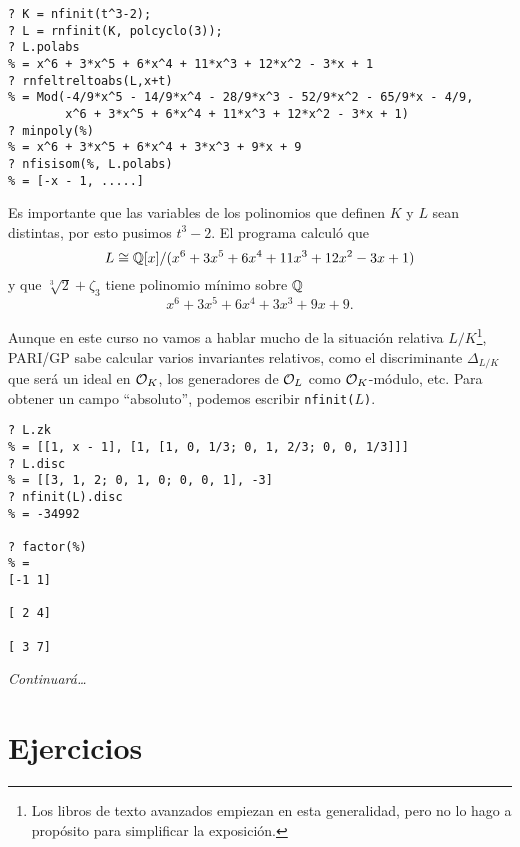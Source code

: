 \begin{shaded}
\begin{verbatim}
? K = nfinit(t^3-2);
? L = rnfinit(K, polcyclo(3));
? L.polabs
% = x^6 + 3*x^5 + 6*x^4 + 11*x^3 + 12*x^2 - 3*x + 1
? rnfeltreltoabs(L,x+t)
% = Mod(-4/9*x^5 - 14/9*x^4 - 28/9*x^3 - 52/9*x^2 - 65/9*x - 4/9,
        x^6 + 3*x^5 + 6*x^4 + 11*x^3 + 12*x^2 - 3*x + 1)
? minpoly(%)
% = x^6 + 3*x^5 + 6*x^4 + 3*x^3 + 9*x + 9
? nfisisom(%, L.polabs)
% = [-x - 1, .....]
\end{verbatim}
\end{shaded}

Es importante que las variables de los polinomios que definen $K$ y $L$ sean
distintas, por esto pusimos $t^3 - 2$. El programa calculó que
$$L \cong \mathbb{Q}[x]/(x^6 + 3 x^5 + 6 x^4 + 11 x^3 + 12 x^2 - 3 x + 1)$$
y que $\sqrt[3]{2} + \zeta_3$ tiene polinomio mínimo sobre $\mathbb{Q}$
$$x^6 + 3 x^5 + 6 x^4 + 3 x^3 + 9 x + 9.$$

Aunque en este curso no vamos a hablar mucho de la situación relativa
$L/K$\footnote{Los libros de texto avanzados empiezan en esta generalidad, pero
  no lo hago a propósito para simplificar la exposición.}, PARI/GP sabe calcular
varios invariantes relativos, como el discriminante $\Delta_{L/K}$ que será un
ideal en $\mathcal{O}_K$, los generadores de $\mathcal{O}_L$ como $\mathcal{O}_K$-módulo, etc. Para obtener
un campo ``absoluto'', podemos escribir \texttt{nfinit($L$)}.

\begin{shaded}
\begin{verbatim}
? L.zk
% = [[1, x - 1], [1, [1, 0, 1/3; 0, 1, 2/3; 0, 0, 1/3]]]
? L.disc
% = [[3, 1, 2; 0, 1, 0; 0, 0, 1], -3]
? nfinit(L).disc
% = -34992

? factor(%)
% = 
[-1 1]

[ 2 4]

[ 3 7]
\end{verbatim}
\end{shaded}

\noindent\emph{Continuará\dots}


\pagebreak


\section*{Ejercicios}

